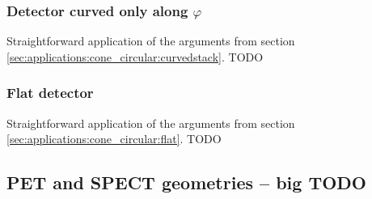 \documentclass{amsart}
\renewcommand*{\phi}{\varphi}
\begin{document}
\subsubsection{Detector curved only along $\phi$}
\label{sec:applications:cone_helical:curvedstack}

Straightforward application of the arguments from section \ref{sec:applications:cone_circular:curvedstack}. TODO
\vspace{5ex}%


\subsubsection{Flat detector}
\label{sec:applications:cone_helical:flat}

Straightforward application of the arguments from section \ref{sec:applications:cone_circular:flat}. TODO
\vspace{5ex}%


\subsection{PET and SPECT geometries -- big TODO}
\end{document}
